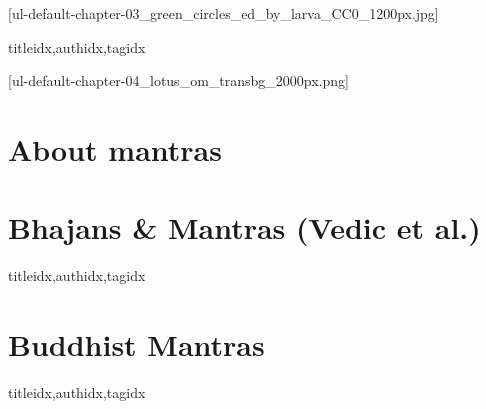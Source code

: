 

  \setcounter{chapter}{2}

  [ul-default-chapter-03_green_circles_ed_by_larva_CC0_1200px.jpg]
    \begin{songs}{titleidx,authidx,tagidx}
      
    \end{songs}

  [ul-default-chapter-04_lotus_om_transbg_2000px.png]
    \section{About mantras}
      
    \clearpage\scleardpage
    \section{Bhajans \& Mantras (Vedic et al.)}
      \begin{songs}{titleidx,authidx,tagidx}
        
      \end{songs}
    \scleardpage
    \section{Buddhist Mantras}
      \begin{songs}{titleidx,authidx,tagidx}
        
      \end{songs}

